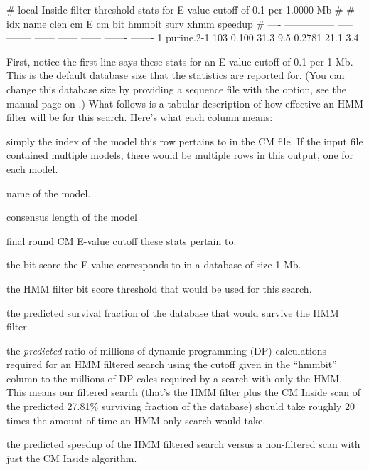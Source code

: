 \newpage
{}

\begin{sreoutput}
# local Inside filter threshold stats for E-value cutoff of  0.1 per 1.0000 Mb
#
#  idx  name              clen      cm E  cm bit  hmmbit    surv     xhmm  speedup
# ----  ---------------  -----  --------  ------  ------  ------  -------  -------
     1  purine.2-1         103     0.100    31.3     9.5  0.2781     21.1      3.4
\end{sreoutput}

First, notice the first line says these stats for an E-value cutoff of
0.1 per 1 Mb. This is the default database size that the statistics are
reported for. (You can change this database size by providing a
sequence file with the  option, see the manual page on
.) What follows is a tabular description of how effective
an HMM filter will be for this search. Here's what each column means:

\begin{wideitem}

\item[\emprog{idx}] simply the index of the model this row pertains to in
  the CM file. If the input file  contained
  multiple models, there would be multiple rows in this output, one for
  each model.

\item[\emprog{name}] name of the model.

\item[\emprog{clen}] consensus length of the model

\item[\emprog{cm E}] final round CM E-value cutoff these stats pertain
  to.

\item[\emprog{cm bit}] the bit score the E-value corresponds to in a
  database of size 1 Mb.

\item[\emprog{hmm bit}] the HMM filter bit score threshold that would
  be used for this search.

\item[\emprog{surv}] the predicted survival fraction of the database
  that would survive the HMM filter.

\item[\emprog{xhmm}] the \emph{predicted} ratio of millions of dynamic programming (DP)
  calculations required for an HMM filtered search using the cutoff
  given in the ``hmmbit'' column to the millions of DP calcs required
  by a search with only the HMM. This means our filtered search
  (that's the HMM filter plus the CM Inside scan of the predicted
  27.81\% surviving fraction of the database) should take
  roughly 20 times the amount of time an HMM only search would take.
  
\item[\emprog{speedup}] the predicted speedup of the HMM filtered
  search versus a non-filtered scan with just the CM Inside algorithm.

\end{wideitem}


